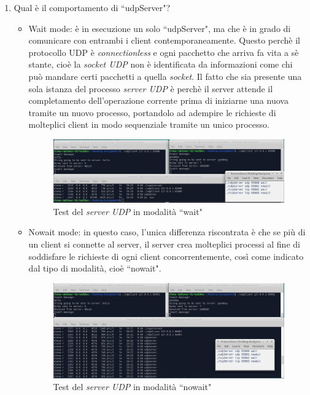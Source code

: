 \documentclass[a4paper, 12pt]{report}
\begin{document}
\begin{enumerate}
	\item Qual è il comportamento di ``udpServer"?
	\begin{itemize}
		\item Wait mode: è in esecuzione un solo ``udpServer", ma che è in grado di comunicare con entrambi i client contemporaneamente. Questo perchè il protocollo UDP è
		\textit{connectionless} e ogni pacchetto che arriva fa vita a sè stante, cioè la \textit{socket UDP} non è identificata da informazioni come chi può mandare certi
		pacchetti a quella  \textit{socket}. Il fatto che sia presente una sola istanza del processo \textit{server UDP} è perchè il server attende il completamento
		dell'operazione corrente prima di iniziarne una nuova tramite un nuovo processo, portandolo ad adempire le richieste di molteplici client in modo sequenziale tramite
		un unico processo.
		\begin{figure}[H]
			\centering
			\includegraphics[width=\linewidth]{images/launch_udpClientWait.JPG}
			\caption{Test del \textit{server UDP} in modalità ``wait"}
		\end{figure}
		\item Nowait mode: in questo caso, l'unica differenza riscontrata è che se più di un client si connette al server, il server crea molteplici processi al fine di
		soddisfare le richieste di ogni client concorrentemente, così come indicato dal tipo di modalità, cioè ``nowait".
		\begin{figure}[H]
			\centering
			\includegraphics[width=\linewidth]{images/launch_udpClientNowait.JPG}
			\caption{Test del \textit{server UDP} in modalità ``nowait"}

\end{figure}
\end{itemize}
\end{enumerate}
\end{document}
